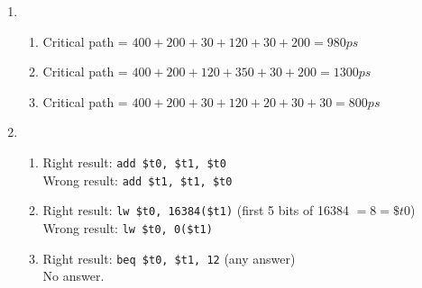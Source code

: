 \documentclass[12pt, a4paper]{article}
\begin{document}
\begin{enumerate}[Q\arabic*.]
  \item 
    \begin{enumerate}[(\alph*.)]
      \item Critical path = $400 + 200 + 30 + 120 + 30 + 200 = 980ps$

      \item Critical path = $400 + 200 + 120 + 350 + 30 + 200 = 1300ps$

      \item Critical path = $400 + 200 + 30 + 120 + 20 + 30 + 30 = 800ps$
    \end{enumerate}

  \item 
    \begin{enumerate}[(\alph*.)]
      \item Right result: \lstinline|add $t0, $t1, $t0|\\
        Wrong result: \lstinline|add $t1, $t1, $t0|

      \item Right result: \lstinline|lw $t0, 16384($t1)| (first 5 bits of 16384 $=8=\$t0$)\\
        Wrong result: \lstinline|lw $t0, 0($t1)|

      \item Right result: \lstinline|beq $t0, $t1, 12| (any answer)\\
        No answer.
    \end{enumerate}
\end{enumerate}
\end{document}
